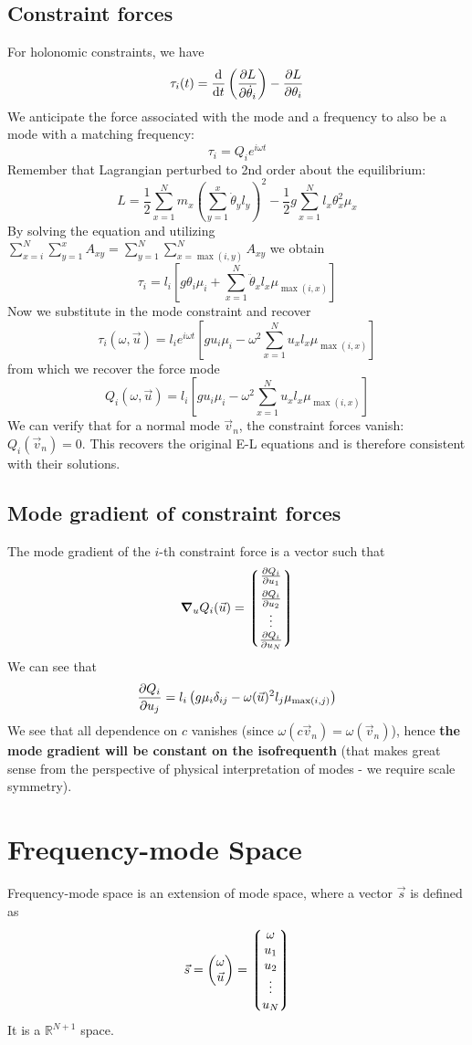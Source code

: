 \documentclass[12pt]{article}
\begin{document}
	\subsection{Constraint forces}
	For holonomic constraints, we have
	$$\tau_i(t)=\dv{}{t}\left(\pdv{L}{\dot{\theta}_i}\right)-\pdv{L}{\theta_i}$$
	We anticipate the force associated with the mode and a frequency to also be a mode with a matching frequency:
	$$\tau_i=Q_i e^{i\omega t}$$
	Remember that Lagrangian perturbed to 2nd order about the equilibrium:
	$$L=\frac{1}{2}\sum\limits_{x=1}^N m_x\left(\sum_{y=1}^x \dot{\theta}_y l_y\right)^2-\frac{1}{2}g\sum_{x=1}^N l_x \theta_x^2 \mu_x$$
	By solving the equation and utilizing $\sum\limits_{x=i}^N\sum\limits_{y=1}^x A_{xy}=\sum\limits_{y=1}^N\sum\limits_{x=\max(i,y)}^N A_{xy}$ we obtain
	$$\tau_i = l_i\left[ g\theta_i\mu_i + \sum_{x=1}^N \ddot{\theta}_x l_x \mu_{\max(i,x)} \right]$$
	Now we substitute in the mode constraint and recover
	$$\tau_i(\omega, \vec{u}) = l_i e^{i\omega t}\left[ g u_i\mu_i - \omega^2 \sum_{x=1}^N u_x l_x \mu_{\max(i,x)} \right]$$
	from which we recover the force mode
	$$Q_i(\omega, \vec{u}) = l_i \left[ g u_i\mu_i - \omega^2 \sum_{x=1}^N  u_x l_x \mu_{\max(i,x)} \right]$$
	We can verify that for a normal mode $\vec{v}_n$, the constraint forces vanish: $Q_i(\vec{v}_n)=0$. This recovers the original E-L equations and is therefore consistent with their solutions.
	
	\subsection{Mode gradient of constraint forces}
	The mode gradient of the $i$-th constraint force is a vector such that
	$$\grad_u Q_i(\vec{u})=\mqty*(\pdv{Q_i}{u_1} \\[5pt] \pdv{Q_i}{u_2} \\ \vdots \\ \pdv{Q_i}{u_N})$$
	We can see that
	$$\pdv{Q_i}{u_j}= l_i\left( g\mu_i\delta_{ij} - \omega(\vec{u})^2  l_j \mu_{\max(i,j)} \right)$$
	We see that all dependence on $c$ vanishes (since $\omega(c\vec{v}_n)=\omega(\vec{v}_n)$), hence \textbf{the mode gradient will be constant on the isofrequenth} (that makes great sense from the perspective of physical interpretation of modes - we require scale symmetry).
	
	\section{Frequency-mode Space}
	Frequency-mode space is an extension of mode space, where a vector $\vec{s}$ is defined as
	$$\vec{s}=\mqty(\omega \\ \vec{u})=\mqty*(\omega \\ u_1 \\ u_2 \\ \vdots \\ u_N)$$
	It is a $\mathbb{R}^{N+1}$ space.
	
\end{document}
